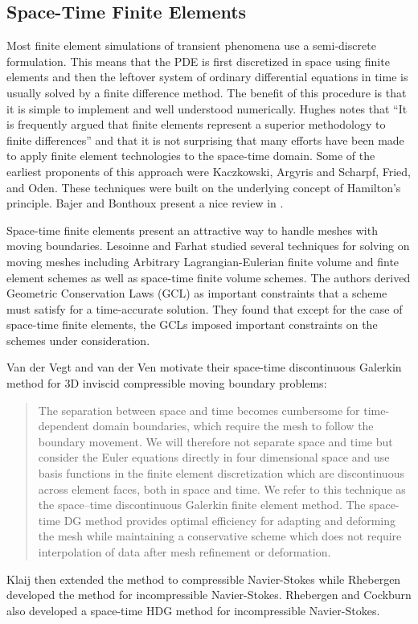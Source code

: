 \documentclass[Dissertation.tex]{subfiles}
\begin{document}
\subsection{Space-Time Finite Elements}
Most finite element simulations of transient phenomena use a semi-discrete formulation.
This means that the PDE is first discretized in space using finite elements and then the leftover system of ordinary differential equations in time
is usually solved by a finite difference method.
The benefit of this procedure is that it is simple to implement and well understood numerically.
Hughes\cite{HughesSpaceTimeElastoDynamics} notes that
``It is frequently argued that finite elements represent a superior methodology to finite differences''
and that it is not surprising that many efforts have been made to apply finite element technologies to the space-time domain.
Some of the earliest proponents of this approach were Kaczkowski\cite{Kaczkowski1975},
Argyris and Scharpf\cite{ArgyrisSpaceTime}, Fried\cite{FriedSpaceTime}, and Oden\cite{OdenSpaceTime}.
These techniques were built on the underlying concept of Hamilton's principle.
Bajer and Bonthoux present a nice review in \cite{Bonthoux1991}.

Space-time finite elements present an attractive way to handle meshes with moving boundaries.
Lesoinne and Farhat\cite{GCL} studied several techniques for solving on moving meshes including Arbitrary Lagrangian-Eulerian
finite volume and finte element schemes as well as space-time finite volume schemes.
The authors derived Geometric Conservation Laws (GCL) as important constraints that a scheme must satisfy for a time-accurate solution.
They found that except for the case of space-time finite elements, the GCLs imposed important constraints on the schemes under consideration.

Van der Vegt and van der Ven\cite{vanderVegtEuler} motivate their space-time discontinuous Galerkin method
for 3D inviscid compressible moving boundary problems:
\begin{quotation}
The separation between space and time becomes cumbersome for time-dependent domain
boundaries, which require the mesh to follow the boundary movement. We will therefore
not separate space and time but consider the Euler equations directly in four dimensional
space and use basis functions in the finite element discretization which are discontinuous
across element faces, both in space and time.
We refer to this technique as the space–time discontinuous Galerkin finite element method.
The space-time DG method provides optimal efficiency for adapting and deforming the mesh while maintaining a conservative scheme which
does not require interpolation of data after mesh refinement or deformation.
\end{quotation}
Klaij \etal\cite{KlaijCompressible} then extended the method to compressible Navier-Stokes while Rhebergen \etal\cite{Rhebergen2013}
developed the method for incompressible Navier-Stokes.
Rhebergen and Cockburn\cite{RhebergenHDG} also developed a space-time HDG method for incompressible Navier-Stokes.
\end{document}
